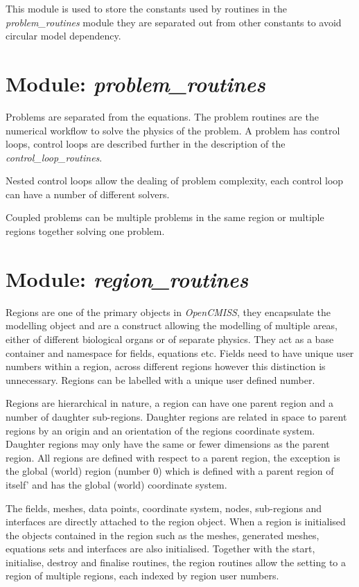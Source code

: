 This module is used to store the constants used by routines in the 
\emph{problem\_routines} module they are separated out from other 
constants to avoid circular model dependency.


\section{Module: \emph{problem\_routines}}
\label{sec:problemroutines}

Problems are separated from the equations. The problem routines are the 
numerical workflow to solve the physics of the problem. A problem has control 
loops, control loops are described further in the description of the 
\emph{control\_loop\_routines}.

Nested control loops allow the dealing of problem complexity, each control 
loop can have a number of different solvers.

Coupled problems can be multiple problems in the same region or multiple 
regions together solving one problem.


\section{Module: \emph{region\_routines}}
\label{sec:regionroutines}

Regions are one of the primary objects in \emph{OpenCMISS}, they encapsulate 
the modelling object and are a construct allowing the modelling of multiple 
areas, either of different biological organs or of separate physics. They act 
as a base container and namespace for fields, equations etc. Fields need to 
have unique user numbers within a region, across different regions however 
this distinction is unnecessary. Regions can be labelled with a unique user 
defined number. 

Regions are hierarchical in nature, a region can have one parent region and a 
number of daughter sub-regions. Daughter regions are related in space to 
parent regions by an origin and an orientation of the regions coordinate 
system. Daughter regions may only have the same or fewer dimensions as the 
parent region. All regions are defined with respect to a parent region, the 
exception is the global (world) region (number $0$) which is defined with a 
parent region of itself' and has the global (world) coordinate system.
  
The fields, meshes, data points, coordinate system, nodes, sub-regions and 
interfaces are directly attached to the region object. When a region is 
initialised the objects contained in the region such as the meshes, generated 
meshes, equations sets and interfaces are also initialised. Together with the 
start, initialise, destroy and finalise routines, the region routines allow 
the setting to a region of multiple regions, each indexed by region user 
numbers.



